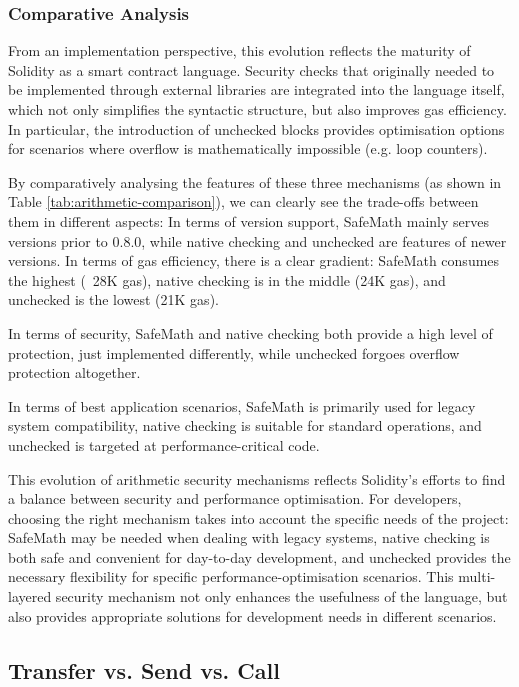 \documentclass[conference]{IEEEtran}
\begin{document}
\subsubsection{Comparative Analysis}
From an implementation perspective, this evolution reflects the maturity of Solidity as a smart contract language. Security checks that originally needed to be implemented through external libraries are integrated into the language itself, which not only simplifies the syntactic structure, but also improves gas efficiency. In particular, the introduction of unchecked blocks provides optimisation options for scenarios where overflow is mathematically impossible (e.g. loop counters).

By comparatively analysing the features of these three mechanisms (as shown in Table \ref{tab:arithmetic-comparison}), we can clearly see the trade-offs between them in different aspects:
In terms of version support, SafeMath mainly serves versions prior to 0.8.0, while native checking and unchecked are features of newer versions.
In terms of gas efficiency, there is a clear gradient: SafeMath consumes the highest (~28K gas), native checking is in the middle (24K gas), and unchecked is the lowest (21K gas).

In terms of security, SafeMath and native checking both provide a high level of protection, just implemented differently, while unchecked forgoes overflow protection altogether.

In terms of best application scenarios, SafeMath is primarily used for legacy system compatibility, native checking is suitable for standard operations, and unchecked is targeted at performance-critical code.

This evolution of arithmetic security mechanisms reflects Solidity's efforts to find a balance between security and performance optimisation. For developers, choosing the right mechanism takes into account the specific needs of the project: SafeMath may be needed when dealing with legacy systems, native checking is both safe and convenient for day-to-day development, and unchecked provides the necessary flexibility for specific performance-optimisation scenarios. This multi-layered security mechanism not only enhances the usefulness of the language, but also provides appropriate solutions for development needs in different scenarios.


\vspace{1em}
\subsection{Transfer vs. Send vs. Call}
\end{document}
